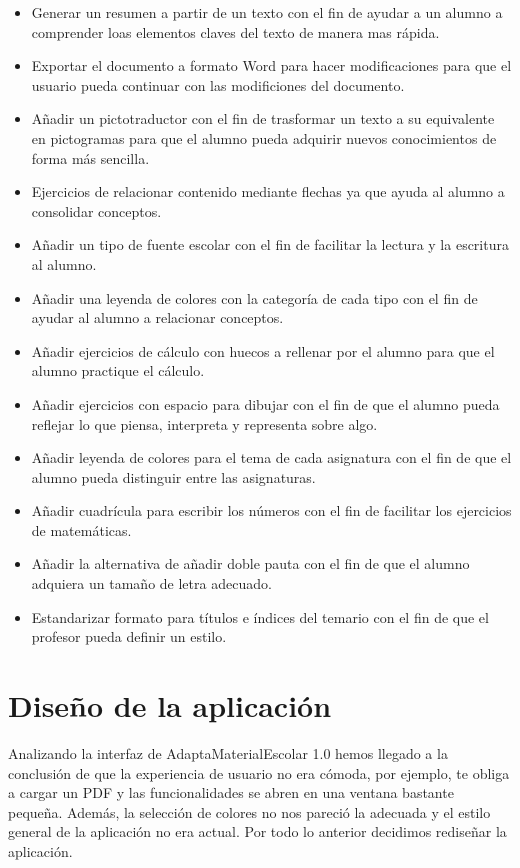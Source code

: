 \begin{itemize}
  \item Generar un resumen a partir de un texto con el fin de ayudar a un alumno a comprender loas elementos claves del texto de manera mas rápida.
  \item Exportar el documento a formato Word para hacer modificaciones para que el usuario pueda continuar con las modificiones del documento.
  \item Añadir un pictotraductor con el fin de trasformar un texto a su equivalente en pictogramas para que el alumno pueda adquirir nuevos conocimientos de forma más sencilla.
  \item Ejercicios de relacionar contenido mediante flechas ya que ayuda al alumno a consolidar conceptos.
  \item Añadir un tipo de fuente escolar con el fin de facilitar la lectura y la escritura al alumno.
  \item Añadir una leyenda de colores con la categoría de cada tipo con el fin de  ayudar al alumno a relacionar conceptos.
  \item  Añadir ejercicios de cálculo con huecos a rellenar por el alumno para que el alumno practique el cálculo.
  \item  Añadir ejercicios con espacio para dibujar con el fin de que el alumno pueda reflejar lo que piensa, interpreta y representa sobre algo.
  \item Añadir leyenda de colores para el tema de cada asignatura con el fin de que el alumno pueda distinguir entre las asignaturas.
  \item Añadir cuadrícula para escribir los números con el fin de facilitar los ejercicios de matemáticas.
  \item Añadir la alternativa de añadir doble pauta con el fin de que el alumno adquiera un tamaño de letra adecuado.
  \item Estandarizar formato para títulos e índices del temario con el fin de que el profesor pueda definir un estilo.

\end{itemize}

\section{Diseño de la aplicación}
\label{disenyoDeLaAplicacion}
Analizando la interfaz de AdaptaMaterialEscolar 1.0 hemos llegado a la conclusión de que la experiencia de usuario no era cómoda, por ejemplo, te obliga a cargar un PDF y las funcionalidades se abren en una ventana bastante pequeña. Además, la selección de colores no nos pareció la adecuada y el estilo general de la aplicación no era actual. Por todo lo anterior decidimos rediseñar la aplicación.


